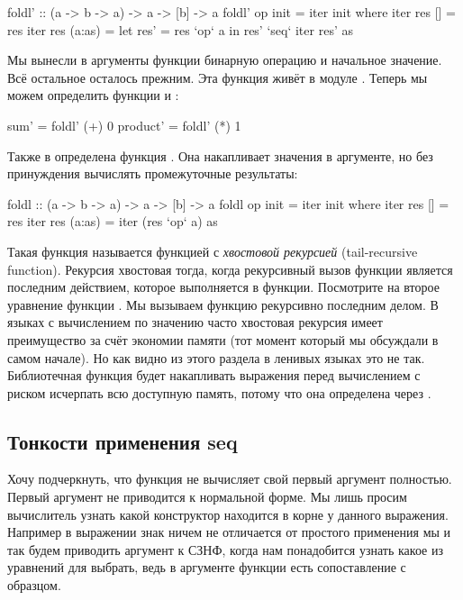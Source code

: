 \begin{code}
foldl' :: (a -> b -> a) -> a -> [b] -> a
foldl' op init = iter init
    where iter res []        = res
          iter res (a:as)    = let res' = res `op` a
                               in  res' `seq` iter res' as 
\end{code}

Мы вынесли в аргументы функции бинарную операцию и 
начальное значение. Всё остальное осталось прежним.
Эта функция живёт в модуле . Теперь
мы можем определить функции  и :

\begin{code}
sum'        = foldl' (+) 0
product'    = foldl' (*) 1
\end{code}


Также в  определена функция . 
Она накапливает значения в аргументе, но без принуждения вычислять 
промежуточные результаты:

\begin{code}
foldl :: (a -> b -> a) -> a -> [b] -> a
foldl op init = iter init
    where iter res []        = res
          iter res (a:as)    = iter (res `op` a) as 
\end{code}

Такая функция называется функцией с \emph{хвостовой рекурсией}
(tail-recursive function). Рекурсия хвостовая тогда, когда 
рекурсивный вызов функции является последним действием, которое 
выполняется в функции. Посмотрите на второе уравнение функции
. Мы вызываем функцию  рекурсивно последним
делом. В языках с вычислением по значению часто хвостовая рекурсия
имеет преимущество за счёт экономии памяти (тот момент который
мы обсуждали в самом начале). Но как видно из этого раздела
в ленивых языках это не так. Библиотечная функция 
будет накапливать выражения перед вычислением с риском
исчерпать всю доступную память, потому что она
определена через .

\subsection{Тонкости применения seq}

Хочу подчеркнуть, что функция  не вычисляет 
свой первый аргумент полностью. Первый аргумент не приводится
к нормальной форме. Мы лишь просим вычислитель узнать какой 
конструктор находится в корне у данного выражения.
Например в выражении  знак
\In{$!} ничем не отличается от простого применения мы
и так будем приводить аргумент  к СЗНФ,
когда нам понадобится узнать какое из уравнений для 
 выбрать, ведь в аргументе функции 
есть сопоставление с образцом.

